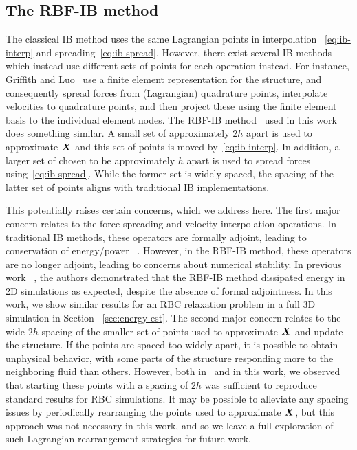 \subsection{The RBF-IB method}\label{sec:rbfib}

The classical IB method uses the same Lagrangian points in interpolation~%
\eqref{eq:ib-interp} and spreading~\eqref{eq:ib-spread}. However, there exist several IB
methods which instead use different sets of points for each operation instead. For
instance, Griffith and Luo~\cite{Griffith:2017id} use a finite element representation for
the structure, and consequently spread forces from (Lagrangian) quadrature points,
interpolate velocities to quadrature points, and then project these using the finite
element basis to the individual element nodes. The RBF-IB method~\cite{Shankar:2015km}
used in this work does something similar. A small set of  approximately $2h$ apart is used to approximate $\boldsymbol{X}$ and this set of
points is moved by~\eqref{eq:ib-interp}. In addition, a larger set of
 chosen to be approximately $h$ apart is used to spread
forces using~\eqref{eq:ib-spread}. While the former set is widely spaced, the spacing of
the latter set of points aligns with traditional IB implementations.

This potentially raises certain concerns, which we address here. The first major concern
relates to the force-spreading and velocity interpolation operations. In traditional IB
methods, these operators are formally adjoint, leading to conservation of energy/power~%
\cite{Peskin:2002go}. However, in the RBF-IB method, these operators are no longer
adjoint, leading to concerns about numerical stability. In previous work~%
\cite{Shankar:2015km}, the authors demonstrated that the RBF-IB method dissipated energy
in 2D simulations as expected, despite the absence of formal adjointness. In this work,
we show similar results for an RBC relaxation problem in a full 3D simulation in Section%
~\ref{sec:energy-est}. The second major concern relates to the wide $2h$ spacing of the
smaller set of points used to approximate $\boldsymbol{X}$ and update the structure. If the points
are spaced too widely apart, it is possible to obtain unphysical behavior, with some
parts of the structure responding more to the neighboring fluid than others.  However,
both in~\cite{Shankar:2015km} and in this work, we observed that starting these points
with a spacing of $2h$ was sufficient to reproduce standard results for RBC simulations.
It may be possible to alleviate any spacing issues by periodically rearranging the points
used to approximate $\boldsymbol{X}$, but this approach was not necessary in this work, and so we
leave a full exploration of such Lagrangian rearrangement strategies for future work.
